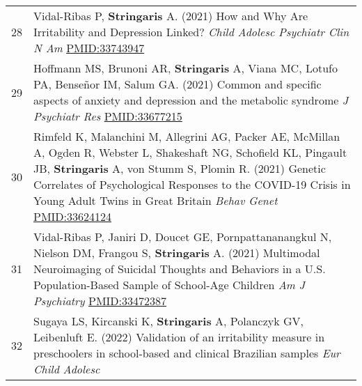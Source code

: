 \documentclass[
]{article}
\begin{document}
\begin{longtable}[]{@{}ll@{}}
\begin{minipage}[t]{0.01\columnwidth}
28\strut
\end{minipage} & \begin{minipage}[t]{0.94\columnwidth}\raggedright
Vidal-Ribas P, \textbf{Stringaris} A. (2021) How and Why Are
Irritability and Depression Linked? \emph{Child Adolesc Psychiatr Clin N
Am} \url{PMID:33743947}\strut
\end{minipage}\tabularnewline
\begin{minipage}[t]{0.01\columnwidth}\raggedright
29\strut
\end{minipage} & \begin{minipage}[t]{0.94\columnwidth}\raggedright
Hoffmann MS, Brunoni AR, \textbf{Stringaris} A, Viana MC, Lotufo PA,
Benseñor IM, Salum GA. (2021) Common and specific aspects of anxiety and
depression and the metabolic syndrome \emph{J Psychiatr Res}
\url{PMID:33677215}\strut
\end{minipage}\tabularnewline
\begin{minipage}[t]{0.01\columnwidth}\raggedright
30\strut
\end{minipage} & \begin{minipage}[t]{0.94\columnwidth}\raggedright
Rimfeld K, Malanchini M, Allegrini AG, Packer AE, McMillan A, Ogden R,
Webster L, Shakeshaft NG, Schofield KL, Pingault JB, \textbf{Stringaris}
A, von Stumm S, Plomin R. (2021) Genetic Correlates of Psychological
Responses to the COVID-19 Crisis in Young Adult Twins in Great Britain
\emph{Behav Genet} \url{PMID:33624124}\strut
\end{minipage}\tabularnewline
\begin{minipage}[t]{0.01\columnwidth}\raggedright
31\strut
\end{minipage} & \begin{minipage}[t]{0.94\columnwidth}\raggedright
Vidal-Ribas P, Janiri D, Doucet GE, Pornpattananangkul N, Nielson DM,
Frangou S, \textbf{Stringaris} A. (2021) Multimodal Neuroimaging of
Suicidal Thoughts and Behaviors in a U.S. Population-Based Sample of
School-Age Children \emph{Am J Psychiatry} \url{PMID:33472387}\strut
\end{minipage}\tabularnewline
\begin{minipage}[t]{0.01\columnwidth}\raggedright
32\strut
\end{minipage} & \begin{minipage}[t]{0.94\columnwidth}\raggedright
Sugaya LS, Kircanski K, \textbf{Stringaris} A, Polanczyk GV, Leibenluft
E. (2022) Validation of an irritability measure in preschoolers in
school-based and clinical Brazilian samples \emph{Eur Child Adolesc
}
\end{minipage}
\end{longtable}
\end{document}
